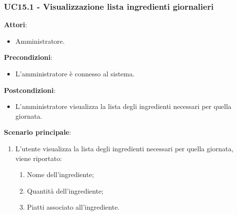 \subsubsection{UC15.1 - Visualizzazione lista ingredienti giornalieri}\label{usecase:15_1}
\textbf{Attori}:
\begin{itemize}
    \item Amministratore.
\end{itemize}
\textbf{Precondizioni}:
\begin{itemize}
    \item L'amministratore è connesso al sistema.
\end{itemize}
\textbf{Postcondizioni}:
\begin{itemize}
    \item L'amministratore visualizza la lista degli ingredienti necessari per quella giornata.
\end{itemize}
\textbf{Scenario principale}:
\begin{enumerate}
    \item L'utente visualizza la lista degli ingredienti necessari per quella giornata, viene riportato:
    \begin{enumerate}
        \item Nome dell'ingrediente;
        \item Quantità dell'ingrediente;
        \item Piatti associato all'ingrediente.
    \end{enumerate}
\end{enumerate}
